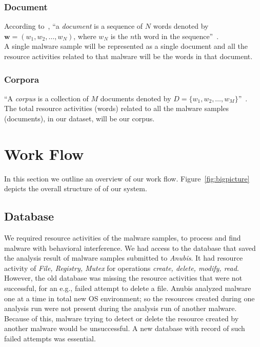 \subsubsection{Document}
According to~\citeauthor{Blei}, ``a \emph{document} is a sequence of $N$ words denoted by $\textbf{w} = (w_1,w_2,\ldots,w_N)$, where $w_N$ is the $n$th word in the sequence''~\cite[]{Blei}.\\
A single malware sample will be represented as a single document and all the resource activities related to that malware will be the words in that document.
\label{ssub:Document}
\subsubsection{Corpora}
\label{ssub:Corpora}
``A \emph{corpus} is a collection of $M$ documents denoted by $D = \{w_1,w_2,\ldots,w_M\}$''~\cite[]{Blei}.\\
The total resource activities (words) related to all the malware samples (documents), in our dataset, will be our corpus.\\

\section{Work Flow}
\label{sec:Work Flow}
In this section we outline an overview of our work flow.
Figure~\ref{fig:bigpicture} depicts the overall structure of of our system.\\
\subsection{Database}
\label{sub:Database}
We required resource activities of the malware samples, to process and find malware with behavioral interference.
We had access to the database that saved the analysis result of malware samples submitted to \emph{Anubis}.
It had resource activity of \emph{File, Registry, Mutex} for operations \emph{create, delete, modify, read}.
\\

However, the old database was missing the resource activities that were not successful, for an e.g., failed attempt to delete a file.
Anubis analyzed malware one at a time in total new OS environment; so the resources created during one analysis run were not present during the analysis run of another malware.
Because of this, malware trying to detect or delete the resource created by another malware would be unsuccessful.
A new database with record of such failed attempts was essential.\\

